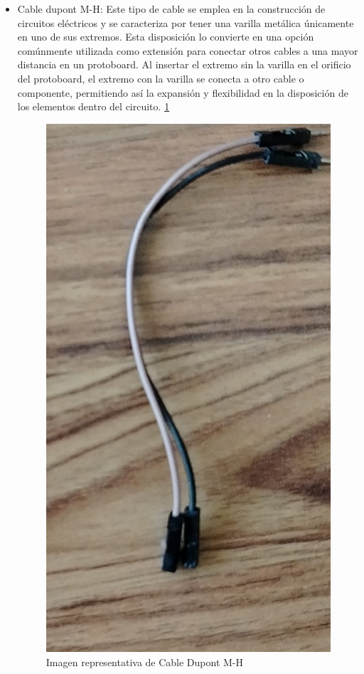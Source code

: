     \begin{itemize}
        \item Cable dupont M-H: Este tipo de cable se emplea en la construcción de circuitos eléctricos y se caracteriza por tener una varilla metálica únicamente en uno de sus extremos. Esta disposición lo convierte en una opción comúnmente utilizada como extensión para conectar otros cables a una mayor distancia en un protoboard. Al insertar el extremo sin la varilla en el orificio del protoboard, el extremo con la varilla se conecta a otro cable o componente, permitiendo así la expansión y flexibilidad en la disposición de los elementos dentro del circuito.  \ref{fig:CableDupontMH}
    
          \begin{figure}[H]
            \centering
            \includegraphics[trim = {0mm 0mm 0mm 0mm},clip,scale=0.1]{12/Img/cableDupontMH.jpg}
            \caption{Imagen representativa de Cable Dupont M-H}
            \label{fig:CableDupontMH}
        \end{figure}
    \end{itemize}
    
